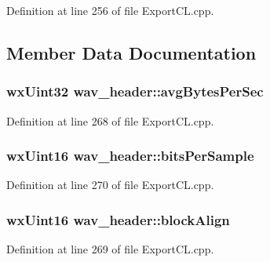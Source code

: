 Definition at line 256 of file Export\+C\+L.\+cpp.



\subsection{Member Data Documentation}
\subsubsection[{\texorpdfstring{avg\+Bytes\+Per\+Sec}{avgBytesPerSec}}]{\setlength{\rightskip}{0pt plus 5cm}wx\+Uint32 wav\+\_\+header\+::avg\+Bytes\+Per\+Sec}\hypertarget{structwav__header_a8148d52018f875c01dad92b38a6262ff}{}\label{structwav__header_a8148d52018f875c01dad92b38a6262ff}


Definition at line 268 of file Export\+C\+L.\+cpp.

\subsubsection[{\texorpdfstring{bits\+Per\+Sample}{bitsPerSample}}]{\setlength{\rightskip}{0pt plus 5cm}wx\+Uint16 wav\+\_\+header\+::bits\+Per\+Sample}\hypertarget{structwav__header_a53f6319c0666d17755849be891772e3a}{}\label{structwav__header_a53f6319c0666d17755849be891772e3a}


Definition at line 270 of file Export\+C\+L.\+cpp.

\subsubsection[{\texorpdfstring{block\+Align}{blockAlign}}]{\setlength{\rightskip}{0pt plus 5cm}wx\+Uint16 wav\+\_\+header\+::block\+Align}\hypertarget{structwav__header_ad0610ad49707c63670844279d4ac1037}{}\label{structwav__header_ad0610ad49707c63670844279d4ac1037}


Definition at line 269 of file Export\+C\+L.\+cpp.


